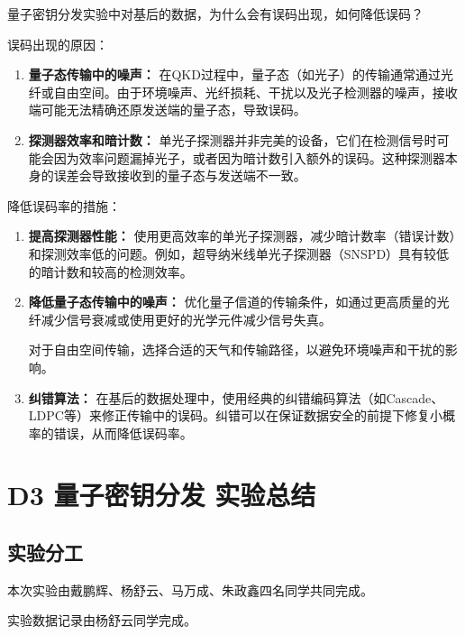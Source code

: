 \documentclass[dvipsnames, svgnames,a4paper,11pt]{article}
\begin{document}
\begin{question}
	量子密钥分发实验中对基后的数据，为什么会有误码出现，如何降低误码？
\end{question}

	误码出现的原因：
	\begin{enumerate}
		\item \textbf{量子态传输中的噪声：}
			在QKD过程中，量子态（如光子）的传输通常通过光纤或自由空间。由于环境噪声、光纤损耗、干扰以及光子检测器的噪声，接收端可能无法精确还原发送端的量子态，导致误码。

		\item \textbf{探测器效率和暗计数：}
			单光子探测器并非完美的设备，它们在检测信号时可能会因为效率问题漏掉光子，或者因为暗计数引入额外的误码。这种探测器本身的误差会导致接收到的量子态与发送端不一致。

	\end{enumerate}

	降低误码率的措施：
	\begin{enumerate}
		\item \textbf{提高探测器性能：}
			使用更高效率的单光子探测器，减少暗计数率（错误计数）和探测效率低的问题。例如，超导纳米线单光子探测器（SNSPD）具有较低的暗计数和较高的检测效率。

		\item \textbf{降低量子态传输中的噪声：}
			优化量子信道的传输条件，如通过更高质量的光纤减少信号衰减或使用更好的光学元件减少信号失真。
		
			对于自由空间传输，选择合适的天气和传输路径，以避免环境噪声和干扰的影响。

		\item \textbf{纠错算法：}
			在基后的数据处理中，使用经典的纠错编码算法（如Cascade、LDPC等）来修正传输中的误码。纠错可以在保证数据安全的前提下修复小概率的错误，从而降低误码率。
	\end{enumerate}


\clearpage
\section{D3 \quad 量子密钥分发 \quad\heiti 实验总结}

	\subsection{实验分工}

		本次实验由戴鹏辉、杨舒云、马万成、朱政鑫四名同学共同完成。

		实验数据记录由杨舒云同学完成。
\end{document}
